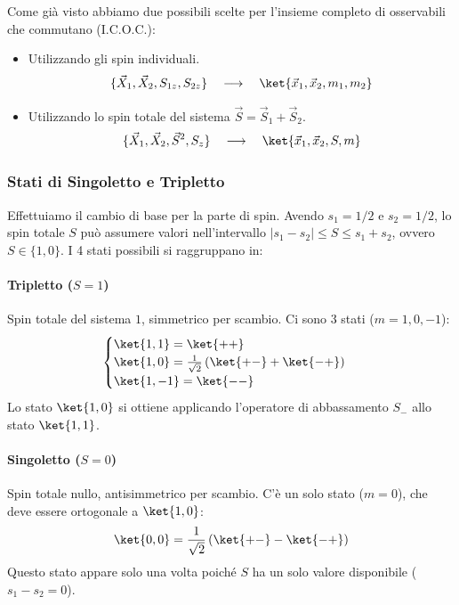 Come già visto abbiamo due possibili scelte per l'insieme completo di osservabili che commutano (I.C.O.C.):
\begin{itemize}
    \item Utilizzando gli spin individuali.
    \[
        \{\vec{X}_1, \vec{X}_2, S_{1z}, S_{2z}\} \quad \longrightarrow \quad \ket{\vec{x}_1, \vec{x}_2, m_1, m_2}
    \]
    
    \item Utilizzando lo spin totale del sistema \(\vec{S} = \vec{S}_1 + \vec{S}_2\).
    \[
        \{\vec{X}_1, \vec{X}_2, \vec{S}^2, S_z\} \quad \longrightarrow \quad \ket{\vec{x}_1, \vec{x}_2, S, m}
    \]
\end{itemize}

\subsubsection{Stati di Singoletto e Tripletto}
Effettuiamo il cambio di base per la parte di spin. Avendo \(s_1 = 1/2\) e \(s_2 = 1/2\), lo spin totale \(S\) può assumere valori nell'intervallo \(|s_1 - s_2| \le S \le s_1 + s_2\), ovvero \(S \in \{1, 0\}\).
I 4 stati possibili si raggruppano in:

\paragraph{Tripletto (\(S=1\))}
Spin totale del sistema \(1\), simmetrico per scambio. Ci sono 3 stati (\(m=1, 0, -1\)):
\begin{equation}
    \begin{cases}
        \ket{1, 1} = \ket{+ +} \\
        \ket{1, 0} = \frac{1}{\sqrt{2}} \left( \ket{+ -} + \ket{- +} \right) \\
        \ket{1, -1} = \ket{- -}
    \end{cases}
\end{equation}
Lo stato \(\ket{1,0}\) si ottiene applicando l'operatore di abbassamento \(S_-\) allo stato \(\ket{1,1}\).

\paragraph{Singoletto (\(S=0\))}
Spin totale nullo, antisimmetrico per scambio. C'è un solo stato (\(m=0\)), che deve essere ortogonale a \(\ket{1,0}\):
\begin{equation}
    \ket{0, 0} = \frac{1}{\sqrt{2}} \left( \ket{+ -} - \ket{- +} \right)
\end{equation}
Questo stato appare solo una volta poiché \(S\) ha un solo valore disponibile (\(s_1 - s_2 = 0\)).

